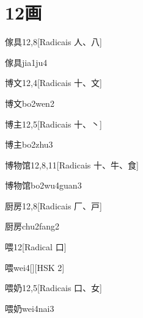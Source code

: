 
\section*{12画}

\begin{entry}{傢具}{12,8}[Radicais ⼈、⼋]
  \begin{phonetics}{傢具}{jia1ju4}
  \end{phonetics}
\end{entry}

\begin{entry}{博文}{12,4}[Radicais ⼗、⽂]
  \begin{phonetics}{博文}{bo2wen2}
  \end{phonetics}
\end{entry}

\begin{entry}{博主}{12,5}[Radicais ⼗、⼂]
  \begin{phonetics}{博主}{bo2zhu3}
  \end{phonetics}
\end{entry}

\begin{entry}{博物馆}{12,8,11}[Radicais ⼗、⽜、⾷]
  \begin{phonetics}{博物馆}{bo2wu4guan3}
  \end{phonetics}
\end{entry}

\begin{entry}{厨房}{12,8}[Radicais ⼚、⼾]
  \begin{phonetics}{厨房}{chu2fang2}
  \end{phonetics}
\end{entry}

\begin{entry}{喂}{12}[Radical ⼝]
  \begin{phonetics}{喂}{wei4}[][HSK 2]
  \end{phonetics}
\end{entry}

\begin{entry}{喂奶}{12,5}[Radicais ⼝、⼥]
  \begin{phonetics}{喂奶}{wei4nai3}
  \end{phonetics}
\end{entry}

